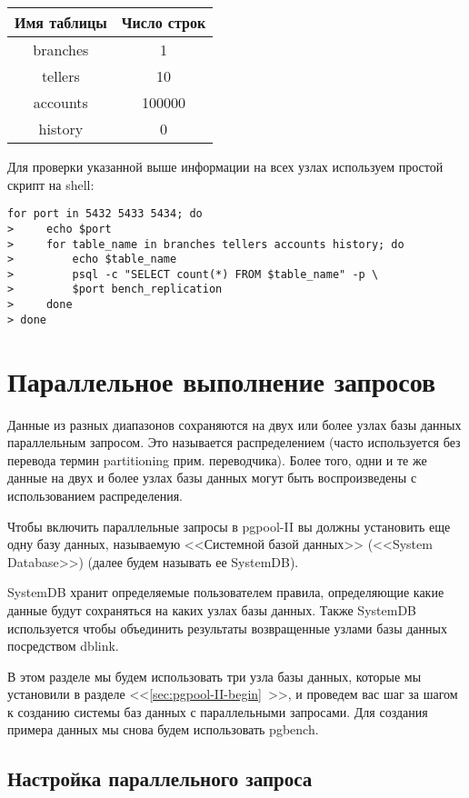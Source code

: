 \begin{tabular}{ | c | c | }
  \hline
  Имя таблицы & Число строк \\
  \hline
  branches & 1 \\
  \hline
  tellers & 10 \\
  \hline
  accounts & 100000 \\
  \hline
  history & 0 \\
  \hline
\end{tabular}

Для проверки указанной выше информации на всех узлах используем простой скрипт на shell:

\begin{lstlisting}[label=lst:pgpool21,caption=Проверка репликации]
for port in 5432 5433 5434; do
>     echo $port
>     for table_name in branches tellers accounts history; do
>         echo $table_name
>         psql -c "SELECT count(*) FROM $table_name" -p \
>         $port bench_replication
>     done
> done
\end{lstlisting}


\section{Параллельное выполнение запросов}

Данные из разных диапазонов сохраняются на двух или более узлах базы данных параллельным запросом. Это называется распределением (часто используется без перевода термин partitioning прим. переводчика). Более того, одни и те же данные на двух и более узлах базы данных могут быть воспроизведены с использованием распределения.

Чтобы включить параллельные запросы в pgpool-II вы должны установить еще одну базу данных, называемую <<Системной базой данных>> (<<System Database>>) (далее будем называть ее SystemDB).

SystemDB хранит определяемые пользователем правила, определяющие какие данные будут сохраняться на каких узлах базы данных. Также SystemDB используется чтобы объединить результаты возвращенные узлами базы данных посредством dblink.

В этом разделе мы будем использовать три узла базы данных, которые мы установили в разделе <<\ref{sec:pgpool-II-begin}~>>, и проведем вас шаг за шагом к созданию системы баз данных с параллельными запросами. Для создания примера данных мы снова будем использовать pgbench.

\subsection{Настройка параллельного запроса}

